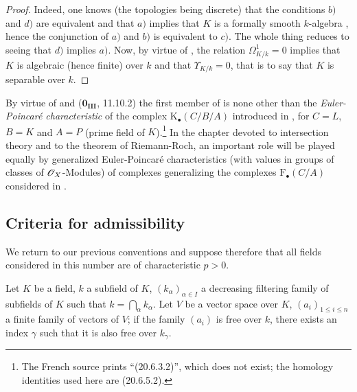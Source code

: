 \begin{proof}
Indeed, one knows (the topologies being discrete) that the conditions $b)$ and $d)$ are equivalent  and that $a)$ implies that $K$ is a formally smooth $k$-algebra , hence the conjunction of $a)$ and $b)$ is equivalent to $c)$.
The whole thing reduces to seeing that $d)$ implies $a)$.
Now, by virtue of , the relation $\Omega^1_{K/k}=0$ implies that $K$ is algebraic (hence finite) over $k$ and that $\Upsilon_{K/k}=0$, that is to say  that $K$ is separable over $k$.
\end{proof}

\begin{remark}[21.7.5]
\label{0.21.7.5}
By virtue of  and ($\mathbf{0_{III}}$, 11.10.2) the first member of  is none other than the \emph{Euler-Poincar\'e characteristic} of the complex $\mathrm{K}_\bullet(C/B/A)$ introduced in , for $C=L$, $B=K$ and $A=P$ (prime field of $K$).\footnote{The French source prints ``(20.6.3.2)'', which does not exist; the homology identities used here are (20.6.5.2).}
In the chapter devoted to intersection theory and to the theorem of Riemann-Roch, an important role will be played equally by generalized Euler-Poincar\'e characteristics (with values in groups of classes of $\mathscr{O}_X$-Modules) of complexes generalizing the complexes $\mathrm{F}_\bullet(C/A)$ considered in .
\end{remark}

\subsection{Criteria for admissibility}
\label{subsection:0.21.8}

We return to our previous conventions and suppose therefore that all fields considered in this number are of characteristic $p>0$.

\begin{lemma}[21.8.1]
\label{0.21.8.1}
Let $K$ be a field, $k$ a subfield of $K$, $(k_\alpha)_{\alpha\in I}$ a decreasing filtering family of subfields of $K$ such that $k=\bigcap_\alpha k_\alpha$.
Let $V$ be a vector space over $K$, $(a_i)_{1\leqslant i\leqslant n}$ a finite family of vectors of $V$; if the family $(a_i)$ is free over $k$, there exists an index $\gamma$ such that it is also free over $k_\gamma$.
\end{lemma}

